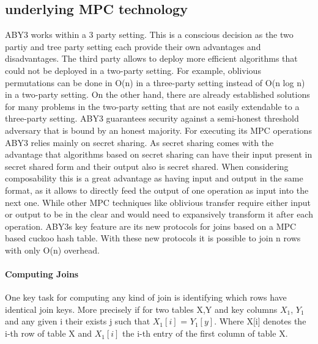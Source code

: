 \subsection{underlying MPC technology}
ABY3 works within a 3 party setting. This is a conscious decision as the two partiy and tree party setting each provide their own advantages and disadvantages.
The third party allows to deploy more efficient algorithms that could not be deployed in a two-party setting. For example, oblivious permutations can be done in O(n) in a three-party setting instead of O(n log n) in a two-party setting. On the other hand, there are already established solutions for many problems in the two-party setting that are not easily extendable to a three-party setting. ABY3 guarantees security against a semi-honest threshold adversary that is bound by an honest majority. For executing its MPC operations ABY3 relies mainly on secret sharing. As secret sharing comes with the advantage that algorithms based on secret sharing can have their input present in secret shared form and their output also is secret shared. When considering composability this is a great advantage as having input and output in the same format, as it allows to directly feed the output of one operation as input into the next one. While other MPC techniques like oblivious transfer require either input or output to be in the clear and would need to expansively transform it after each operation. 
ABY3s key feature are its new protocols for joins based on a MPC based cuckoo hash table. With these new protocols it is possible to join n rows with only O(n) overhead.






\paragraph{Computing Joins}
One key task for computing any kind of join is identifying which rows have identical join keys. More precisely if for two tables X,Y and key columns $X_1$, $Y_1$ and any given i  their exists j such that $X_1[i]$ = $Y_1[y]$. Where X[i] denotes the i-th row of table X and $ X_1[i] $ the i-th entry of the first column of table X. 

